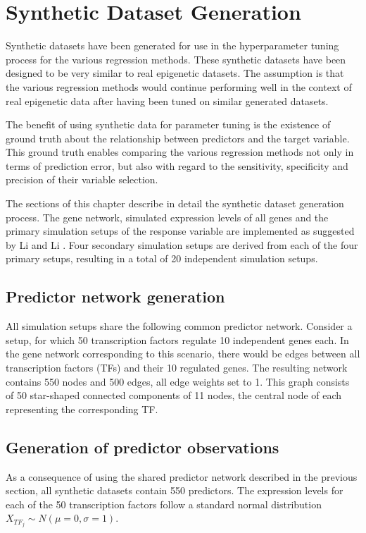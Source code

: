 \chapter{Synthetic Dataset Generation}
Synthetic datasets have been generated for use in the hyperparameter tuning process for the various regression methods. These synthetic datasets have been designed to be very similar to real epigenetic datasets. The assumption is that the various regression methods would continue performing well in the context of real epigenetic data after having been tuned on similar generated datasets.

The benefit of using synthetic data for parameter tuning is the existence of ground truth about the relationship between predictors and the target variable. This ground truth enables comparing the various regression methods not only in terms of prediction error, but also with regard to the sensitivity, specificity and precision of their variable selection.

The sections of this chapter describe in detail the synthetic dataset generation process. The gene network, simulated expression levels of all genes and the primary simulation setups of the response variable are implemented as suggested by Li and Li \cite{li2008network}. Four secondary simulation setups are derived from each of the four primary setups, resulting in a total of 20 independent simulation setups.


\section{Predictor network generation} \label{sec:pred_net}
All simulation setups share the following common predictor network. Consider a setup, for which 50 transcription factors regulate 10 independent genes each. In the gene network corresponding to this scenario, there would be edges between all transcription factors (TFs) and their 10 regulated genes. The resulting network contains 550 nodes and 500 edges, all edge weights set to 1. This graph consists of 50 star-shaped connected components of 11 nodes, the central node of each representing the corresponding TF. 


\section{Generation of predictor observations} \label{sec:obs_gen}
As a consequence of using the shared predictor network described in the previous section, all synthetic datasets contain 550 predictors. The expression levels for each of the 50 transcription factors follow a standard normal distribution $X_{TF_j} \sim N(\mu = 0, \sigma = 1)$. 

